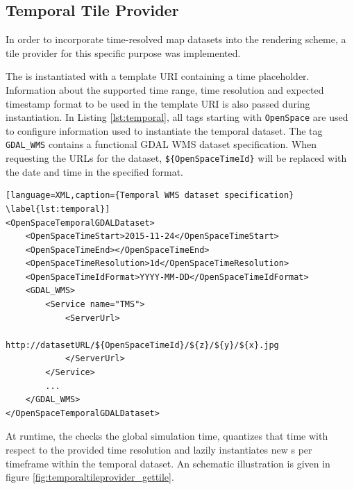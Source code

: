 \subsection{Temporal Tile Provider}
In order to incorporate time-resolved map datasets into the rendering scheme, a tile provider for this specific purpose was implemented.

The  is instantiated with a template URI containing a time placeholder. Information about the supported time range, time resolution and expected timestamp format to be used in the template URI is also passed during instantiation. In Listing \ref{lst:temporal}, all tags starting with \texttt{OpenSpace} are used to configure information used to instantiate the temporal dataset. The tag \texttt{GDAL\_WMS} contains a functional GDAL WMS dataset specification. When requesting the URLs for the dataset, \texttt{\$\{OpenSpaceTimeId\}} will be replaced with the date and time in the specified format.

\begin{lstlisting}[language=XML,caption={Temporal WMS dataset specification} \label{lst:temporal}]
<OpenSpaceTemporalGDALDataset>
    <OpenSpaceTimeStart>2015-11-24</OpenSpaceTimeStart>
    <OpenSpaceTimeEnd></OpenSpaceTimeEnd>
    <OpenSpaceTimeResolution>1d</OpenSpaceTimeResolution>
    <OpenSpaceTimeIdFormat>YYYY-MM-DD</OpenSpaceTimeIdFormat>
    <GDAL_WMS>
        <Service name="TMS">
            <ServerUrl>
                http://datasetURL/${OpenSpaceTimeId}/${z}/${y}/${x}.jpg 
            </ServerUrl>
        </Service>
        ...
    </GDAL_WMS>
</OpenSpaceTemporalGDALDataset>
\end{lstlisting}

At runtime, the  checks the global simulation time, quantizes that time with respect to the provided time resolution and lazily instantiates new s per timeframe within the temporal dataset. An schematic illustration is given in figure \ref{fig:temporaltileprovider_gettile}.

